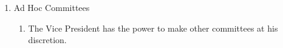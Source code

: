 \begin{enumerate}
\begin{enumerate}
		\end{enumerate}

	\item Ad Hoc Committees
		\begin{enumerate}
			\item The Vice President has the power to make other committees at his discretion. \label{adhoccom}
		\end{enumerate}
\end{enumerate}
							

